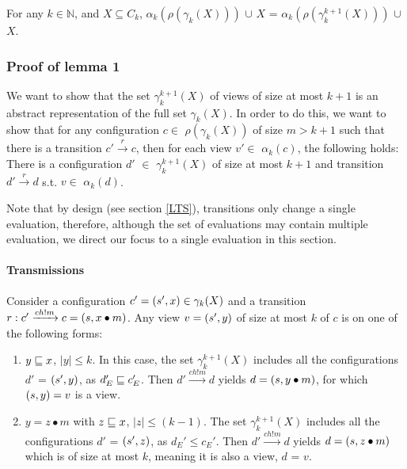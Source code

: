 \begin{lemma}
\label{lemma1}
For any $k\in\mathbb{N}$, and $X\subseteq C_k$, $\alpha_k(\rho(\gamma_k(X)))$ $\cup$ $X$ = $\alpha_k(\rho(\gamma_k^{k+1}(X)))$ $\cup$ $X$.
\end{lemma}

\subsubsection{Proof of lemma 1}
We want to show that the set $\gamma_k^{k+1}(X)$ of views of size at most $k+1$ is an abstract representation of the full set $\gamma_k(X)$. In order to do this, 
we want to show that for any configuration $c \in$ $\rho(\gamma_k(X))$ of size $m > k + 1$ such that there is a transition  $c' \xrightarrow{r} c$, then for each view $v' \in$ $\alpha_k(c)$, the following holds: There is a configuration $d'$ $\in$ $\gamma_k^{k+1}(X)$ of size at most $k+1$ and transition $ d' \xrightarrow{r} d$ s.t. $v \in$ $\alpha_k(d)$.

Note that by design (see section \ref{LTS}), transitions only change a single evaluation, therefore, although the set of evaluations may contain multiple evaluation, we direct our focus to a single evaluation in this section.

\paragraph{Transmissions}
\label{proofTransmission}
Consider a configuration $c' = (s', x) \in \gamma_k(X)$ and a transition $r: c' \xrightarrow{ch!m} c = (s,x \bullet m)$. Any view $v = (s', y)$ of size at most $k$ of $c$ is on one of the following forms:

\begin{enumerate}
\item
$y \sqsubseteq x$, $|y| \leq k$. In this case, the set $\gamma_k^{k+1}(X)$ includes all the configurations $d'$ = $(s', y)$, as $d_E' \sqsubseteq c_E'$. Then $d' \xrightarrow{ch!m} d$ yields $d = (s, y\bullet m)$, for which $(s, y) = v$ is a view.
\item
$y = z\bullet m$ with $z \sqsubseteq x$, $|z| \leq (k-1)$. The set $\gamma_k^{k+1}(X)$ includes all the configurations $d'$ = $(s', z)$, as $d_E' \leq c_E'$. Then $d' \xrightarrow{ch!m} d$ yields $d = (s, z\bullet m)$ which is of size at most $k$, meaning it is also a view, $d$ = $v$.
\end{enumerate}



